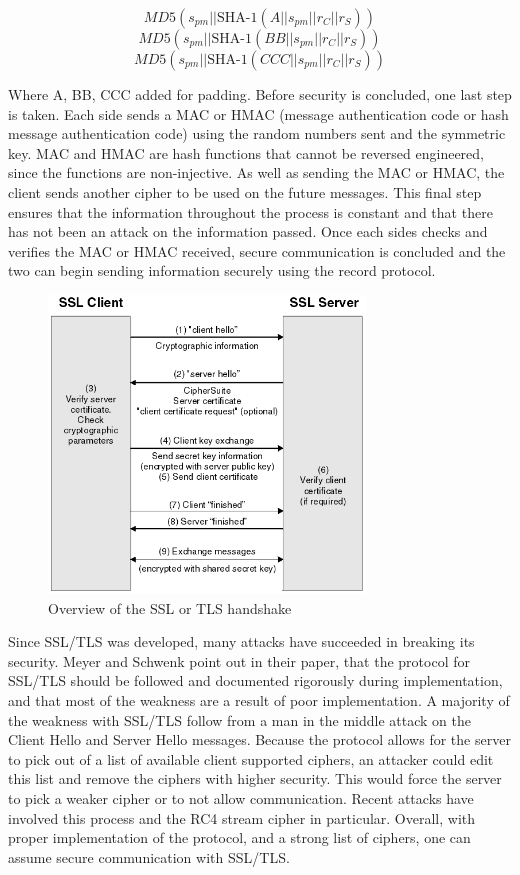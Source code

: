 \[ MD5(s_{pm}||\text{SHA-1}(A||s_{pm}||r_{C}||r_{S})) \]
\[ MD5(s_{pm}||\text{SHA-1}(BB||s_{pm}||r_{C}||r_{S})) \]
\[ MD5(s_{pm}||\text{SHA-1}(CCC||s_{pm}||r_{C}||r_{S})) \] 

Where A, BB, CCC added for padding\cite[p. 282]{trappe}.  Before security is
concluded, one last step is taken.  Each side sends a MAC or HMAC (message
authentication code or hash message authentication code) using the random
numbers sent and the symmetric key.  MAC and HMAC are hash functions that
cannot be reversed engineered, since the functions are non-injective.  As well
as sending the MAC or HMAC, the client sends another cipher to be used on the
future messages.  This final step ensures that the information throughout the
process is constant and that there has not been an attack on the information
passed.  Once each sides checks and verifies the MAC or HMAC received, secure
communication is concluded and the two can begin sending information
securely using the record protocol\cite[p. 58]{rescorla}.

\begin{figure}[h!]
    \caption{Overview of the SSL or TLS handshake\cite{ibm}}
    \centering
        \includegraphics[width=0.75\textwidth]{SSL_TLS_Diagram.png}
\end{figure}

Since SSL/TLS was developed, many attacks have succeeded in breaking its
security.  Meyer and Schwenk point out in their paper, that the protocol for
SSL/TLS should be followed and documented rigorously during implementation, and
that most of the weakness are a result of poor implementation\cite[p.
14]{meyer}.  A majority of the weakness with SSL/TLS follow from a man in the
middle attack on the Client Hello and Server Hello messages.  Because the
protocol allows for the server to pick out of a list of available client
supported ciphers, an attacker could edit this list and remove the ciphers with
higher security.  This would force the server to pick a weaker cipher or to not
allow communication.  Recent attacks have involved this process and the RC4
stream cipher in particular.  Overall, with proper implementation of the
protocol, and a strong list of ciphers,  one can assume secure communication
with SSL/TLS.
